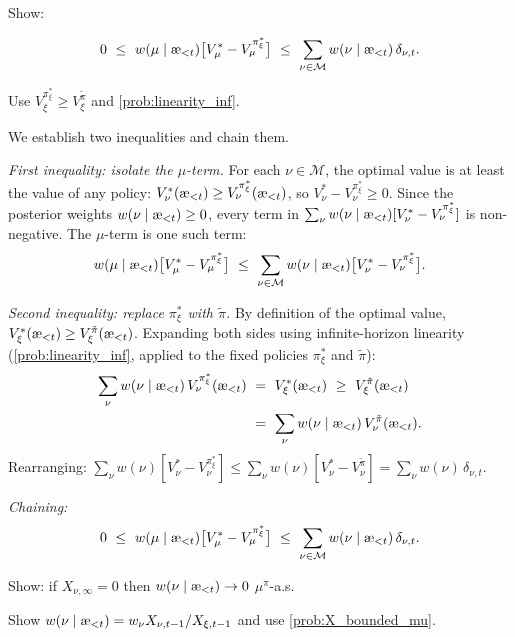 \documentclass[fontsize=11pt, parskip=half]{scrartcl}
\newcommand{\cM}{\mathcal{M}}
\newcommand{\aes}{\textnormal{\ae}}
\begin{document}
\begin{exercise}
\label{prob:chain_ineq}
Show:

\[
    0 ~\leq~ w(\mu \mid \aes_{<t}) \big[V_\mu^* - V_\mu^{\pi_\xi^*}\big]
    ~\leq~ \sum_{\nu \in \cM} w(\nu \mid \aes_{<t})\, \delta_{\nu,t}.
\]
\begin{hint}
Use $V_\xi^{\pi_\xi^*} \geq V_\xi^{\tilde\pi}$ and \cref{prob:linearity_inf}.
\end{hint}
\end{exercise}

\begin{solution}
We establish two inequalities and chain them.

\emph{First inequality: isolate the $\mu$-term.}
For each $\nu \in \cM$, the optimal value is at least the value of any policy: $V_\nu^*(\aes_{<t}) \geq V_\nu^{\pi_\xi^*}(\aes_{<t})$, so $V_\nu^* - V_\nu^{\pi_\xi^*} \geq 0$.
Since the posterior weights $w(\nu \mid \aes_{<t}) \geq 0$, every term in $\sum_\nu w(\nu \mid \aes_{<t})[V_\nu^* - V_\nu^{\pi_\xi^*}]$ is non-negative. The $\mu$-term is one such term:
\[
    w(\mu \mid \aes_{<t})\big[V_\mu^* - V_\mu^{\pi_\xi^*}\big]
    ~\leq~ \sum_{\nu \in \cM} w(\nu \mid \aes_{<t})\big[V_\nu^* - V_\nu^{\pi_\xi^*}\big].
\]

\emph{Second inequality: replace $\pi_\xi^*$ with $\tilde\pi$.}
By definition of the optimal value, $V_\xi^*(\aes_{<t}) \geq V_\xi^{\tilde\pi}(\aes_{<t})$.
Expanding both sides using infinite-horizon linearity (\cref{prob:linearity_inf}, applied to the fixed policies $\pi_\xi^*$ and $\tilde\pi$):
\begin{align*}
    \sum_\nu w(\nu \mid \aes_{<t})\, V_\nu^{\pi_\xi^*}(\aes_{<t})
    ~&=~ V_\xi^*(\aes_{<t})
    ~\geq~ V_\xi^{\tilde\pi}(\aes_{<t}) \\
    ~&=~ \sum_\nu w(\nu \mid \aes_{<t})\, V_\nu^{\tilde\pi}(\aes_{<t}).
\end{align*}
Rearranging: $\sum_\nu w(\nu)[V_\nu^* - V_\nu^{\pi_\xi^*}] \leq \sum_\nu w(\nu)[V_\nu^* - V_\nu^{\tilde\pi}] = \sum_\nu w(\nu)\, \delta_{\nu,t}$.

\emph{Chaining:}
\[
    0 ~\leq~ w(\mu \mid \aes_{<t})\big[V_\mu^* - V_\mu^{\pi_\xi^*}\big]
    ~\leq~ \sum_{\nu \in \cM} w(\nu \mid \aes_{<t})\, \delta_{\nu,t}.
\]
\end{solution}

\begin{exercise}
\label{prob:vanishing_posterior}
Show: if $X_{\nu,\infty} = 0$ then $w(\nu \mid \aes_{<t}) \to 0$ $\mu^\pi$-a.s.


\begin{hint}
Show $w(\nu \mid \aes_{<t}) = w_\nu X_{\nu,t-1}/X_{\xi,t-1}$ and use \cref{prob:X_bounded_mu}.
\end{hint}
\end{exercise}
\end{document}
